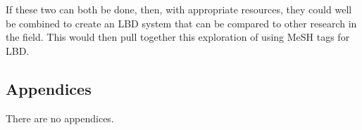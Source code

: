\documentclass{l4proj}
\begin{document}
If these two can both be done, then, with appropriate resources, they could well be combined to create an LBD system that can be compared to other research in the field. This would then pull together this exploration of using MeSH tags for LBD. \\

\begin{appendices}

\chapter{Appendices}

There are no appendices. 

\end{appendices}






\end{document}
